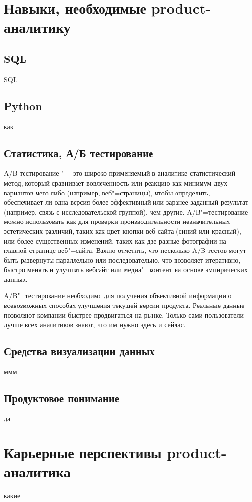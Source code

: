 \documentclass[referat, times]{SCWorks}
\begin{document}
\section{Навыки, необходимые product-аналитику}

\subsection{SQL}
SQL

\subsection{Python}
как 

\subsection{Статистика, А/Б тестирование}
A/B-тестирование "--- это широко применяемый в аналитике
статистический метод, который сравнивает вовлеченность или реакцию как
минимум двух вариантов чего-либо (например, веб"=страницы), чтобы
определить, обеспечивает ли одна версия более эффективный или заранее
заданный результат (например, связь с исследовательской группой), чем
другие. A/B"=тестирование можно использовать как для проверки
производительности незначительных эстетических различий, таких как цвет
кнопки веб-сайта (синий или красный), или более существенных изменений,
таких как две разные фотографии на главной странице веб"=сайта. Важно
отметить, что несколько A/B-тестов могут быть развернуты параллельно или
последовательно, что позволяет итеративно, быстро менять и улучшать вебсайт или медиа"=контент на основе эмпирических данных\cite{miller2021b}.

A/B"=тестирование необходимо для получения объективной информации
о всевозможных способах улучшения текущей версии продукта. Реальные
данные позволяют компании быстрее продвигаться на рынке. Только сами
пользователи лучше всех аналитиков знают, что им нужно здесь и сейчас\cite{ABtest}.

\subsection{Средства визуализации данных}
ммм

\subsection{Продуктовое понимание}
да

\section{Карьерные перспективы product-аналитика}
какие
\end{document}
